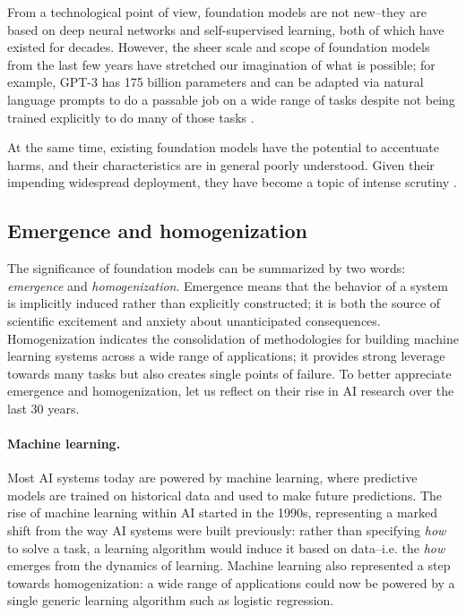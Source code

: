 From a technological point of view, foundation models are not new--they are based on deep neural networks and self-supervised learning, both of which have existed for decades. However, the sheer scale and scope of foundation models from the last few years have stretched our imagination of what is possible; for example, GPT-3 has 175 billion parameters and can be adapted via natural language prompts to do a passable job on a wide range of tasks despite not being trained explicitly to do many of those tasks \citep{brown2020gpt3}.

At the same time, existing foundation models have the potential to accentuate harms, and their characteristics are in general poorly understood. Given their impending widespread deployment, they have become a topic of intense scrutiny \citep{bender2021}.

\subsection{Emergence and homogenization}
\label{sec:emergence-homogenization}

The significance of foundation models can be summarized by two words: \emph{emergence} and \emph{homogenization}.
Emergence means that the behavior of a system is implicitly induced rather than explicitly constructed; it is both the source of scientific excitement and anxiety about unanticipated consequences. Homogenization indicates the consolidation of methodologies for building machine learning systems across a wide range of applications; it provides strong leverage towards many tasks but also creates single points of failure. To better appreciate emergence and homogenization, let us reflect on their rise in AI research over the last 30 years.

\paragraph{Machine learning.}

Most AI systems today are powered by machine learning, where predictive models are trained on historical data and used to make future predictions. The rise of machine learning within AI started in the 1990s, representing a marked shift from the way AI systems were built previously: rather than specifying \emph{how} to solve a task, a learning algorithm would induce it based on data--i.e. the \emph{how} emerges from the dynamics of learning. Machine learning also represented a step towards homogenization: a wide range of applications could now be powered by a single generic learning algorithm such as logistic regression.

